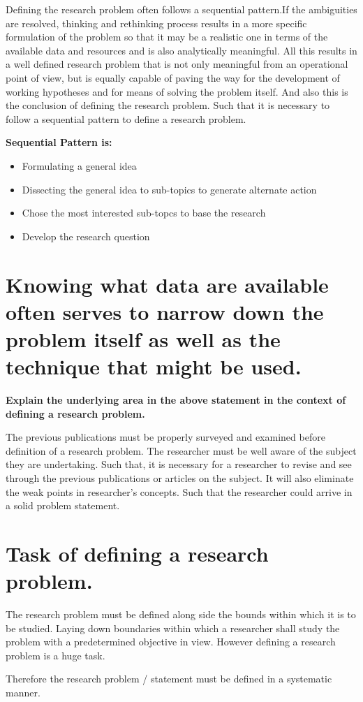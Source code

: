 \documentclass[12pt,a4paper,oneside]{article}
\begin{document}
Defining the research problem often follows a sequential pattern.If the ambiguities are resolved, thinking and rethinking process results in a more specific formulation of the problem so that it may be a realistic one in terms of the available data and resources and is also analytically meaningful. All this results in a well defined research problem that is not only meaningful from an operational point of view, but is equally capable of paving the way for the development of working hypotheses and for means of solving the problem itself. And also this is the conclusion of defining the research problem. Such that it is necessary to follow a sequential pattern to define a research problem. 

\textbf{Sequential Pattern is:}
\begin{itemize}
 \item Formulating a general idea
 \item Dissecting the general idea to sub-topics to generate alternate action
 \item Chose the most interested sub-topcs to base the research
 \item Develop the research question

\end{itemize}

\section{Knowing what data are available often serves to narrow down the problem itself as well as the technique that might be used.}

\textbf{Explain the underlying area in the above statement in the context of defining a research problem.}

The previous publications must be properly surveyed and examined before definition of a research problem. The researcher must be well aware of the subject they are undertaking. Such that, it is necessary for a  researcher to revise and see through the previous publications or articles on the subject. It will also eliminate the weak points in researcher's concepts. Such that the researcher could arrive in a solid problem statement. 


\section{Task of defining a research problem.}

The research problem must be defined along side the bounds within which it is to be studied. Laying down boundaries within which a researcher shall study the problem with a predetermined objective in view. However defining a research problem is a huge task. 

Therefore the research problem / statement must be defined in a systematic manner.

\clearpage
{}
\printbibliography
\end{document}
